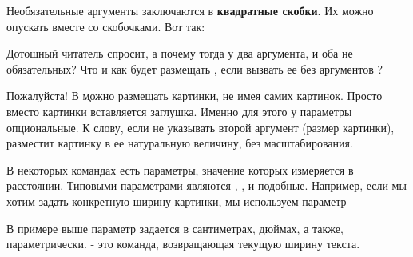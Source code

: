 {{{{Необязательные аргументы заключаются в {\bf квадратные скобки}. Их можно опускать вместе со скобочками. Вот так:

\vbox{
 \hfill
\startTEX
{}
\stopTEX
\stopdescr
}

\vbox{
 \hfill
\startCODERESULT
{}
\stopCODERESULT
\stopdescr
}

Дотошный читатель спросит, а почему тогда у  два аргумента,
и оба не обязательных? Что и как будет размещать , если
вызвать ее без аргументов ?

 \hfill
\startTEX
\externalfigure
\stopTEX
\stopdescr

 \hfill
\startCODERESULT
\externalfigure
\stopCODERESULT
\stopdescr

Пожалуйста! В \c можно размещать картинки, не имея самих картинок. Просто вместо
картинки вставляется заглушка. Именно для этого у  параметры
опциональные. К слову, если не указывать второй аргумент (размер
картинки),  разместит картинку в ее натуральную величину,
без масштабирования.


\subject{Размерности}

В некоторых командах есть параметры, значение которых измеряется в
расстоянии. Типовыми параметрами
являются , ,  и подобные. Например,
если мы хотим задать конкретную ширину картинки, мы используем
параметр 

\vbox{
 \hfill
\startTEX
{}
\stopTEX
\stopdescr
}

\vbox{
 \hfill
\startCODERESULT
{}
\stopCODERESULT
\stopdescr
}

В примере выше параметр  задается в сантиметрах, дюймах, а
также, параметрически.  - это команда, возвращающая текущую
ширину текста.

}}}}
